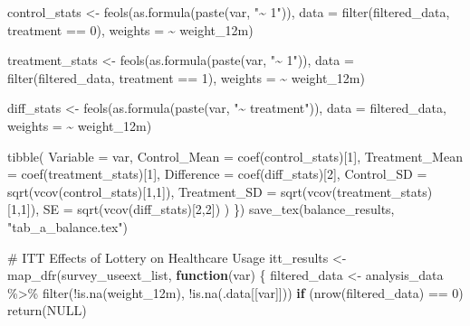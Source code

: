 \documentclass[
  letterpaper,
  DIV=11,
  numbers=noendperiod]{scrartcl}
\newenvironment{Shaded}{\begin{snugshade}}{\end{snugshade}}
\newcommand{\AttributeTok}[1]{\textcolor[rgb]{0.40,0.45,0.13}{#1}}
\newcommand{\CommentTok}[1]{\textcolor[rgb]{0.37,0.37,0.37}{#1}}
\newcommand{\ConstantTok}[1]{\textcolor[rgb]{0.56,0.35,0.01}{#1}}
\newcommand{\ControlFlowTok}[1]{\textcolor[rgb]{0.00,0.23,0.31}{\textbf{#1}}}
\newcommand{\DecValTok}[1]{\textcolor[rgb]{0.68,0.00,0.00}{#1}}
\newcommand{\FunctionTok}[1]{\textcolor[rgb]{0.28,0.35,0.67}{#1}}
\newcommand{\NormalTok}[1]{\textcolor[rgb]{0.00,0.23,0.31}{#1}}
\newcommand{\OtherTok}[1]{\textcolor[rgb]{0.00,0.23,0.31}{#1}}
\newcommand{\SpecialCharTok}[1]{\textcolor[rgb]{0.37,0.37,0.37}{#1}}
\newcommand{\StringTok}[1]{\textcolor[rgb]{0.13,0.47,0.30}{#1}}
\begin{document}
\begin{Shaded}
\begin{Highlighting}[]
\NormalTok{  control\_stats }\OtherTok{\textless{}{-}} \FunctionTok{feols}\NormalTok{(}\FunctionTok{as.formula}\NormalTok{(}\FunctionTok{paste}\NormalTok{(var, }\StringTok{"\textasciitilde{} 1"}\NormalTok{)), }
                         \AttributeTok{data =} \FunctionTok{filter}\NormalTok{(filtered\_data, treatment }\SpecialCharTok{==} \DecValTok{0}\NormalTok{), }
                         \AttributeTok{weights =} \SpecialCharTok{\textasciitilde{}}\NormalTok{ weight\_12m)}
  
\NormalTok{  treatment\_stats }\OtherTok{\textless{}{-}} \FunctionTok{feols}\NormalTok{(}\FunctionTok{as.formula}\NormalTok{(}\FunctionTok{paste}\NormalTok{(var, }\StringTok{"\textasciitilde{} 1"}\NormalTok{)), }
                           \AttributeTok{data =} \FunctionTok{filter}\NormalTok{(filtered\_data, treatment }\SpecialCharTok{==} \DecValTok{1}\NormalTok{), }
                           \AttributeTok{weights =} \SpecialCharTok{\textasciitilde{}}\NormalTok{ weight\_12m)}
  
\NormalTok{  diff\_stats }\OtherTok{\textless{}{-}} \FunctionTok{feols}\NormalTok{(}\FunctionTok{as.formula}\NormalTok{(}\FunctionTok{paste}\NormalTok{(var, }\StringTok{"\textasciitilde{} treatment"}\NormalTok{)), }
                      \AttributeTok{data =}\NormalTok{ filtered\_data, }
                      \AttributeTok{weights =} \SpecialCharTok{\textasciitilde{}}\NormalTok{ weight\_12m)}
  
  \FunctionTok{tibble}\NormalTok{(}
    \AttributeTok{Variable =}\NormalTok{ var,}
    \AttributeTok{Control\_Mean =} \FunctionTok{coef}\NormalTok{(control\_stats)[}\DecValTok{1}\NormalTok{],}
    \AttributeTok{Treatment\_Mean =} \FunctionTok{coef}\NormalTok{(treatment\_stats)[}\DecValTok{1}\NormalTok{],}
    \AttributeTok{Difference =} \FunctionTok{coef}\NormalTok{(diff\_stats)[}\DecValTok{2}\NormalTok{],}
    \AttributeTok{Control\_SD =} \FunctionTok{sqrt}\NormalTok{(}\FunctionTok{vcov}\NormalTok{(control\_stats)[}\DecValTok{1}\NormalTok{,}\DecValTok{1}\NormalTok{]),}
    \AttributeTok{Treatment\_SD =} \FunctionTok{sqrt}\NormalTok{(}\FunctionTok{vcov}\NormalTok{(treatment\_stats)[}\DecValTok{1}\NormalTok{,}\DecValTok{1}\NormalTok{]),}
    \AttributeTok{SE =} \FunctionTok{sqrt}\NormalTok{(}\FunctionTok{vcov}\NormalTok{(diff\_stats)[}\DecValTok{2}\NormalTok{,}\DecValTok{2}\NormalTok{])}
\NormalTok{  )}
\NormalTok{\})}
\FunctionTok{save\_tex}\NormalTok{(balance\_results, }\StringTok{"tab\_a\_balance.tex"}\NormalTok{)}

\CommentTok{\# ITT Effects of Lottery on Healthcare Usage}
\NormalTok{itt\_results }\OtherTok{\textless{}{-}} \FunctionTok{map\_dfr}\NormalTok{(survey\_useext\_list, }\ControlFlowTok{function}\NormalTok{(var) \{}
\NormalTok{  filtered\_data }\OtherTok{\textless{}{-}}\NormalTok{ analysis\_data }\SpecialCharTok{\%\textgreater{}\%} \FunctionTok{filter}\NormalTok{(}\SpecialCharTok{!}\FunctionTok{is.na}\NormalTok{(weight\_12m), }\SpecialCharTok{!}\FunctionTok{is.na}\NormalTok{(.data[[var]]))}
  \ControlFlowTok{if}\NormalTok{ (}\FunctionTok{nrow}\NormalTok{(filtered\_data) }\SpecialCharTok{==} \DecValTok{0}\NormalTok{) }\FunctionTok{return}\NormalTok{(}\ConstantTok{NULL}\NormalTok{)}
  

\end{Highlighting}
\end{Shaded}
\end{document}
